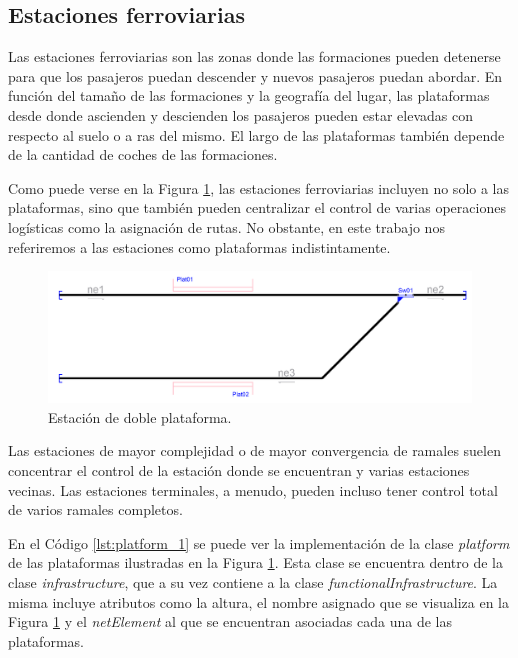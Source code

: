 \subsection{Estaciones ferroviarias}
    \label{sec:platform}
    
    Las estaciones ferroviarias son las zonas donde las formaciones pueden detenerse para que los pasajeros puedan descender y nuevos pasajeros puedan abordar. En función del tamaño de las formaciones y la geografía del lugar, las plataformas desde donde ascienden y descienden los pasajeros pueden estar elevadas con respecto al suelo o a ras del mismo. El largo de las plataformas también depende de la cantidad de coches de las formaciones.
    
    Como puede verse en la Figura \ref{fig:estacion_1}, las estaciones ferroviarias incluyen no solo a las plataformas, sino que también pueden centralizar el control de varias operaciones logísticas como la asignación de rutas. No obstante, en este trabajo nos referiremos a las estaciones como plataformas indistintamente.
    
        \begin{figure}[H]
            \centering
            \includegraphics[width=1\textwidth]{Figuras/Platform.png}
            \centering\caption{Estación de doble plataforma.}
            \label{fig:estacion_1}
        \end{figure}
    
    Las estaciones de mayor complejidad o de mayor convergencia de ramales suelen concentrar el control de la estación donde se encuentran y varias estaciones vecinas. Las estaciones terminales, a menudo, pueden incluso tener control total de varios ramales completos.

    En el Código \ref{lst:platform_1} se puede ver la implementación de la clase \textit{platform} de las plataformas ilustradas en la Figura \ref{fig:estacion_1}. Esta clase se encuentra dentro de la clase \textit{infrastructure}, que a su vez contiene a la clase \textit{functionalInfrastructure}. La misma incluye atributos como la altura, el nombre asignado que se visualiza en la Figura \ref{fig:estacion_1} y el \textit{netElement} al que se encuentran asociadas cada una de las plataformas.

